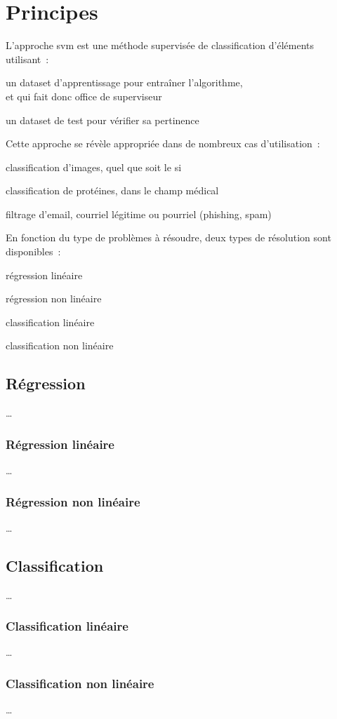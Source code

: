 \section{Principes}

L’approche \gls{svm} est une méthode supervisée de classification d’éléments
utilisant :
\begin{enum}
\item{un \gls{dataset} d’apprentissage pour entraîner l’algorithme,\\
et qui fait donc office de superviseur}
\item{un \gls{dataset} de test pour vérifier sa pertinence}
\end{enum}

Cette approche se révèle appropriée dans de nombreux cas d’utilisation :
\begin{itmz}
\item{classification d’images, quel que soit le \gls{si}}
\item{classification de protéines, dans le champ médical}
\item{filtrage d’email, courriel légitime ou pourriel (phishing, spam)}
\end{itmz}

En fonction du type de problèmes à résoudre,
deux types de résolution sont disponibles :
\begin{itmz}
\item{régression linéaire}
\item{régression non linéaire}
\item{classification linéaire}
\item{classification non linéaire}
\end{itmz}

\subsection{Régression}

…

\subsubsection{Régression linéaire}

…

\subsubsection{Régression non linéaire}

…

\subsection{Classification}

…

\subsubsection{Classification linéaire}

…

\subsubsection{Classification non linéaire}

…

\cite{csd}

\pagebreak
